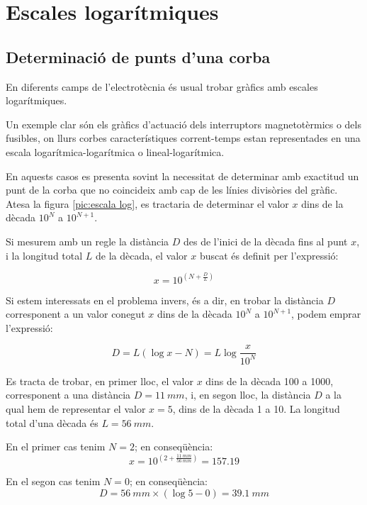 \section{Escales logarítmiques}\label{sec:escales-log} 

\subsection{Determinació de punts d'una corba}

En diferents camps de l'electrotècnia és usual trobar gràfics amb escales
logarítmiques.

Un exemple clar són els gràfics d'actuació dels interruptors magnetotèrmics o dels
fusibles, on llurs corbes característiques corrent-temps estan representades en
una escala logarítmica-logarítmica o lineal-logarítmica.

En aquests casos es presenta sovint la necessitat de determinar amb exactitud un
punt de la corba que no coincideix amb cap de les línies divisòries del gràfic. Atesa
la figura \vref{pic:escala log}, es tractaria de determinar el valor $x$ dins de la dècada
$10^N$ a $10^{N+1}$.

\begin{center}
    
    \label{pic:escala log}
\end{center}

Si mesurem amb un regle la distància $D$ des de l'inici de la dècada fins al punt $x$, i
la longitud total $L$ de la dècada, el valor $x$ buscat és definit per l'expressió:

\begin{equation}
    x = 10^{\left(N+\frac{D}{L}\right)}
\end{equation}

Si estem interessats en el problema invers, és a dir, en  trobar la distància $D$
corresponent a un valor conegut $x$ dins de la dècada $10^N$ a $10^{N+1}$, podem emprar
l'expressió:

\begin{equation}
    D = L(\log x - N) = L \log\frac{x}{10^N}
\end{equation}

	
\begin{exemple}[\ValorsEscalaLog{}]
	\addcontentsxms{\ValorsEscalaLog}
    Es tracta de trobar, en primer lloc, el valor $x$ dins de la dècada 100 a 1000, corresponent a una
    distància $D=\qty{11}{mm}$, i, en segon lloc, la distància $D$ a la qual hem de representar el valor $x=5$, dins de la
    dècada 1 a 10. La longitud total d'una dècada és $L=\qty{56}{mm}$.

    En el primer cas tenim $N=2$; en conseqüència:
    \[
        x = 10^{\left(2+\frac{\qty{11}{mm}}{\qty{56}{mm}}\right)}= \num{157,19}
    \]

    En el segon cas tenim $N=0$; en conseqüència:
    \[
        D = \qty{56}{mm} \times (\log 5 - 0)  = \qty{39,1}{mm}
    \]

\end{exemple}


